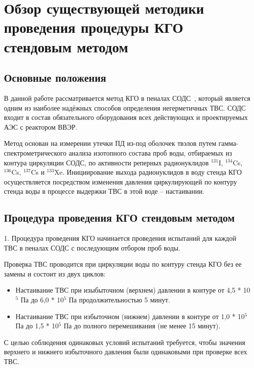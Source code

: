 
\section{Обзор существующей методики проведения процедуры КГО стендовым методом}

\subsection{Основные положения}

В данной работе рассматривается метод КГО в пеналах СОДС~\cite{RD}, который является одним из наиболее надёжных способов определения негерметичных ТВС. СОДС входит в состав обязательного оборудования всех действующих и проектируемых АЭС с реактором ВВЭР.

Метод основан на измерении утечки ПД из-под оболочек твэлов путем гамма-спектрометрического анализа изотопного состава проб воды, отбираемых из контура циркуляции СОДС, по активности реперных радионуклидов $^{131}$I, $^{134}$Cs, $^{136}$Cs, $^{137}$Cs и $^{133}$Xe. Инициирование выхода радионуклидов в воду стенда КГО осуществляется посредством изменения давления циркулирующей по контуру стенда воды в процессе выдержки ТВС в этой воде -- настаивании.

\subsection{Процедура проведения КГО стендовым методом}
1. Процедура проведения КГО начинается проведения испытаний для каждой ТВС в пеналах СОДС с последующим отбором проб воды. 

Проверка ТВС проводится при циркуляции воды по контуру стенда КГО без ее замены и состоит из двух циклов:
\begin{itemize}
\item Настаивание ТВС при изыбыточном (верхнем) давлении в контуре от 4,5 * 10$^{5}$ Па до 6,0 * 10$^{5}$ Па продолжительностью 5 минут.

\item Настаивание ТВС при избыточном (нижнем) давлении в контуре от 1,0 * 10$^{5}$ Па до 1,5 * 10$^{5}$ Па до полного перемешивания (не менее 15 минут).
\end{itemize}

С целью соблюдения одинаковых условий испытаний требуется, чтобы значения верхнего и нижнего избыточного давления были одинаковыми при проверке всех ТВС. 

